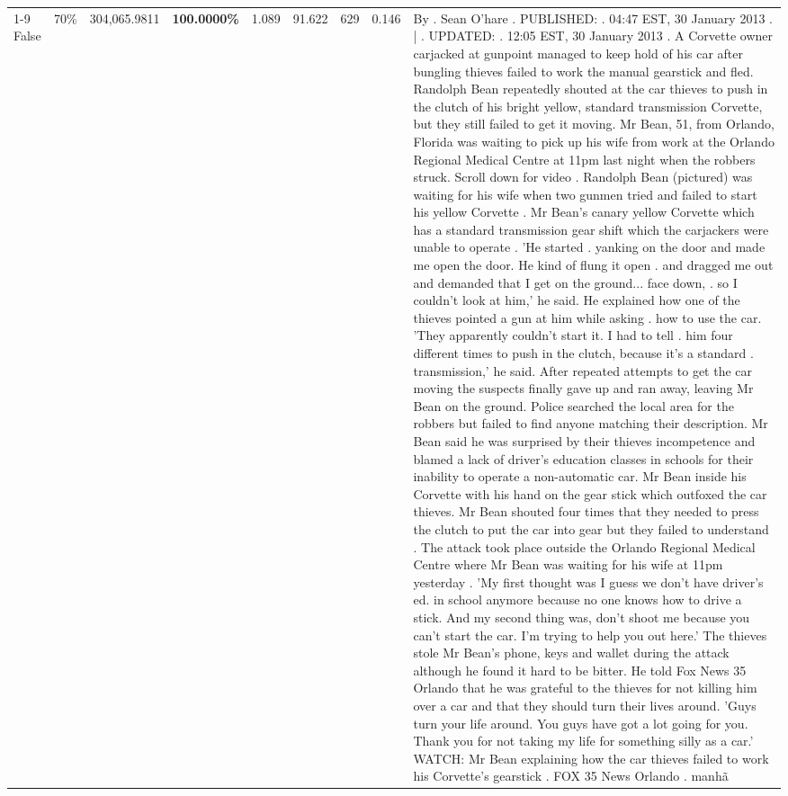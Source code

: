 \begin{table}[H]
\begin{tabular}{lllrlllll}
\cline{1-9} \cline{2-9}
False & 70\% & 304,065.9811 & \bfseries \color{red} 100.0000\% & 1.089 & 91.622 & 629 & 0.146 & By . Sean O'hare . PUBLISHED: . 04:47 EST, 30 January 2013 . | . UPDATED: . 12:05 EST, 30 January 2013 . A Corvette owner carjacked at gunpoint managed to keep hold of his car after bungling thieves failed to work the manual gearstick and fled. Randolph Bean repeatedly shouted at the car thieves to push in the clutch of his bright yellow, standard transmission Corvette, but they still failed to get it moving. Mr Bean, 51, from Orlando, Florida was waiting to pick up his wife from work at the Orlando Regional Medical Centre at 11pm last night when the robbers struck. Scroll down for video . Randolph Bean (pictured) was waiting for his wife when two gunmen tried and failed to start his yellow Corvette . Mr Bean's canary yellow Corvette which has a standard transmission gear shift which the carjackers were unable to operate . 'He started . yanking on the door and made me open the door. He kind of flung it open . and dragged me out and demanded that I get on the ground... face down, . so I couldn't look at him,' he said. He explained how one of the thieves pointed a gun at him while asking . how to use the car. 'They apparently couldn't start it. I had to tell . him four different times to push in the clutch, because it's a standard . transmission,' he said. After repeated attempts to get the car moving the suspects finally gave up and ran away, leaving Mr Bean on the ground. Police searched the local area for the robbers but failed to find anyone matching their description. Mr Bean said he was surprised by their thieves incompetence and blamed a lack of driver's education classes in schools for their inability to operate a non-automatic car. Mr Bean inside his Corvette with his hand on the gear stick which outfoxed the car thieves. Mr Bean shouted four times that they needed to press the clutch to put the car into gear but they failed to understand . The attack took place outside the Orlando Regional Medical Centre where Mr Bean was waiting for his wife at 11pm yesterday . 'My first thought was I guess we don't have driver's ed. in school anymore because no one knows how to drive a stick. And my second thing was, don't shoot me because you can't start the car. I'm trying to help you out here.' The thieves stole Mr Bean's phone, keys and wallet during the attack although he found it hard to be bitter. He told Fox News 35 Orlando that he was grateful to the thieves for not killing him over a car and that they should turn their lives around. 'Guys turn your life around. You guys have got a lot going for you. Thank you for not taking my life for something silly as a car.' WATCH: Mr Bean explaining how the car thieves failed to work his Corvette's gearstick . FOX 35 News Orlando . manhã \\

\end{tabular}
\end{table}
